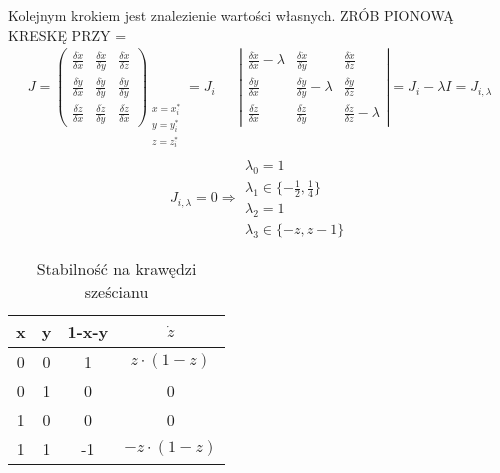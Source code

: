 Kolejnym krokiem jest znalezienie wartości własnych.
{\color{red} ZRÓB PIONOWĄ KRESKĘ PRZY =}
\begin{align*}
J= \left(
\begin{array}{ccc}
\frac{\delta \dot{x}}{\delta x} & \frac{\delta \dot{x}}{\delta y} & \frac{\delta \dot{x}}{\delta z} \\
\frac{\delta \dot{y}}{\delta x} & \frac{\delta \dot{y}}{\delta y} & \frac{\delta \dot{y}}{\delta y} \\
\frac{\delta \dot{z}}{\delta x} & \frac{\delta \dot{z}}{\delta y} & \frac{\delta \dot{z}}{\delta x}
\end{array}
\right)_{
	\begin{array}{c}
		x=x^*_i\\
		y=y^*_i\\
		z=z^*_i\\	
	\end{array}	
} = J_i
&&
\left|
\begin{array}{ccc}
\frac{\delta \dot{x}}{\delta x}-\lambda & \frac{\delta \dot{x}}{\delta y} & \frac{\delta \dot{x}}{\delta z} \\
\frac{\delta \dot{y}}{\delta x} & \frac{\delta \dot{y}}{\delta y}-\lambda & \frac{\delta \dot{y}}{\delta z} \\
\frac{\delta \dot{z}}{\delta x} & \frac{\delta \dot{z}}{\delta y} & \frac{\delta \dot{z}}{\delta z}-\lambda
\end{array}
\right| = J_i - \lambda I = J_{i,\lambda} 
\end{align*}
\begin{equation*}
J_{i,\lambda} = 0 \Rightarrow 
\begin{array}{l}
\lambda_0 = 1\\
\lambda_1 \in \{-\frac{1}{2}, \frac{1}{4}\}\\
\lambda_2 = 1\\
\lambda_3 \in \{-z, z-1\}
\end{array}
\end{equation*}
\begin{wraptable}{rh}{0.35\textwidth}
    \centering
    \caption{Stabilność na krawędzi sześcianu}
\label{tab:krawedz_prawd}
\begin{tabular}{c|c|c|c}
x & y & 1-x-y & $\dot{z}$       \\ \hline 
0 & 0 & 1     & $z \cdot (1-z)$  \\
0 & 1 & 0     & 0                \\
1 & 0 & 0     & 0                \\
1 & 1 & -1    & $-z \cdot (1-z)$
\end{tabular}
\end{wraptable}
